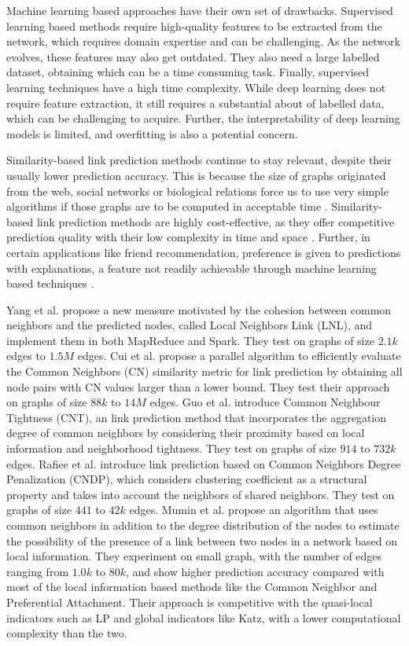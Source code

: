 Machine learning based approaches have their own set of drawbacks. Supervised learning based methods require high-quality features to be extracted from the network, which requires domain expertise and can be challenging. As the network evolves, these features may also get outdated. They also need a large labelled dataset, obtaining which can be a time consuming task. Finally, supervised learning techniques have a high time complexity. While deep learning does not require feature extraction, it still requires a substantial about of labelled data, which can be challenging to acquire. Further, the interpretability of deep learning models is limited, and overfitting is also a potential concern.

Similarity-based link prediction methods continue to stay relevant, despite their usually lower prediction accuracy. This is because the size of graphs originated from the web, social networks or biological relations force us to use very simple algorithms if those graphs are to be computed in acceptable time \cite{garcia2014link}. Similarity-based link prediction methods are highly cost-effective, as they offer competitive prediction quality with their low complexity in time and space \cite{zhou2021progresses}. Further, in certain applications like friend recommendation, preference is given to predictions with explanations, a feature not readily achievable through machine learning based techniques \cite{barbieri2014follow}.


Yang et al. \cite{yang2015new} propose a new measure motivated by the cohesion between common neighbors and the predicted nodes, called Local Neighbors Link (LNL), and implement them in both MapReduce and Spark. They test on graphs of size $2.1k$ edges to $1.5M$ edges.
Cui et al. \cite{cui2016bounded} propose a parallel algorithm to efficiently evaluate the Common Neighbors (CN) similarity metric for link prediction by obtaining all node pairs with CN values larger than a lower bound. They test their approach on graphs of size $88k$ to $14M$ edges.
Guo et al. \cite{guo2019node} introduce Common Neighbour Tightness (CNT), an link prediction method that incorporates the aggregation degree of common neighbors by considering their proximity based on local information and neighborhood tightness. They test on graphs of size $914$ to $732k$ edges.
Rafiee et al. \cite{rafiee2020cndp} introduce link prediction based on Common Neighbors Degree Penalization (CNDP), which considers clustering coefficient as a structural property and takes into account the neighbors of shared neighbors. They test on graphs of size $441$ to $42k$ edges.
Mumin et al. \cite{mumin2022efficient} propose an algorithm that uses common neighbors in addition to the degree distribution of the nodes to estimate
the possibility of the presence of a link between two nodes in a network based on local information. They experiment on small graph, with the number of edges ranging from $1.0k$ to $80k$, and show higher prediction accuracy compared with most of the local information based methods like the Common Neighbor and Preferential Attachment. Their approach is competitive with the quasi-local indicators such as LP and global indicators like Katz, with a lower computational complexity than the two.

